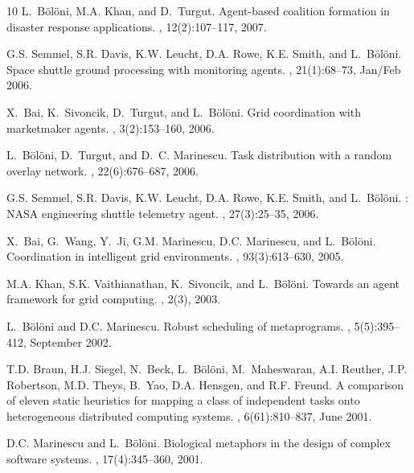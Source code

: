 \begin{thebibliography}{10}
L.~Bölöni, M.A. Khan, and D.~Turgut.
\newblock Agent-based coalition formation in disaster response applications.
,
  12(2):107--117, 2007.

G.S. Semmel, S.R. Davis, K.W. Leucht, D.A. Rowe, K.E. Smith, and L.~Bölöni.
\newblock Space shuttle ground processing with monitoring agents.
, 21(1):68--73, Jan/Feb 2006.

X.~Bai, K.~Sivoncik, D.~Turgut, and L.~Bölöni.
\newblock Grid coordination with marketmaker agents.
,
  3(2):153--160, 2006.

L.~Bölöni, D.~Turgut, and D.~C. Marinescu.
\newblock Task distribution with a random overlay network.
, 22(6):676--687,
  2006.

G.S. Semmel, S.R. Davis, K.W. Leucht, D.A. Rowe, K.E. Smith, and L.~Bölöni.
: {NASA} engineering shuttle telemetry agent.
, 27(3):25--35, 2006.

X.~Bai, G.~Wang, Y.~Ji, G.M. Marinescu, D.C. Marinescu, and L.~Bölöni.
\newblock Coordination in intelligent grid environments.
, 93(3):613--630, 2005.

M.A. Khan, S.K. Vaithianathan, K.~Sivoncik, and L.~Bölöni.
\newblock Towards an agent framework for grid computing.
, 2(3), 2003.

L.~Bölöni and D.C. Marinescu.
\newblock Robust scheduling of metaprograms.
, 5(5):395--412, September 2002.

T.D. Braun, H.J. Siegel, N.~Beck, L.~Bölöni, M.~Maheswaran, A.I. Reuther,
  J.P. Robertson, M.D. Theys, B.~Yao, D.A. Hensgen, and R.F. Freund.
\newblock A comparison of eleven static heuristics for mapping a class of
  independent tasks onto heterogeneous distributed computing systems.
, 6(61):810--837,
  June 2001.

D.C. Marinescu and L.~Bölöni.
\newblock Biological metaphors in the design of complex software systems.
, 17(4):345--360,
  2001.


\end{thebibliography}
